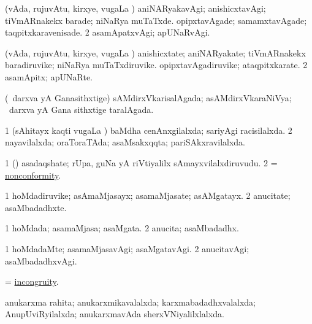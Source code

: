 \bentry
{}
\gl{\kirxvi}
\bmng
\bnum
{} (vAda, rujuvAtu, kirxye, \mo vugaLa \vi) 
\banum
{} aniNARyakavAgi; anishicxtavAgi; tiVmARnakekx barade; niNaRya muTaTxde. 
 opipxtavAgade; samamxtavAgade; taqpitxkaravenisade. 
\eanum
\numie
\num{2} asamApatxvAgi; apUNaRvAgi. 
\enum
\emng
\eentry

\bentry
{}
\gl{\nA}
\bmng
\bnum
{} (vAda, rujuvAtu, kirxye, \mo vugaLa \vi) 
\banum
{} anishicxtate; aniNARyakate; tiVmARnakekx baradiruvike; niNaRya muTaTxdiruvike. 
 opipxtavAgadiruvike; ataqpitxkarate. 
\eanum
\numie
\num{2} asamApitx; apUNaRte. 
\enum
\emng
\eentry

\bentry
{}
\gl{\gu}
\bmng
(\kanmu\ darxva yA Ganasithxtige) sAMdirxVkarisalAgada; asAMdirxVkaraNiVya; \kanmu\ darxva yA Gana sithxtige taralAgada. 
\emng
\eentry

\bentry
{}
\gl{\gu}
\bmng
\bnum
\num{1} (sAhitayx kaqti \mo vugaLa \vi) baMdha cenAnxgilalxda; sariyAgi racisilalxda. 
\num{2} nayavilalxda; oraToraTAda; asaMsakxqqta; pariSAkxravilalxda. 
\enum
\emng
\eentry

\bentry
{}
\gl{\nA}
\bmng
\bnum
\num{1} (\pArxparx) asadaqshate; rUpa, guNa yA riVtiyalilx sAmayxvilalxdiruvudu. 
\num{2} = \hyperref{kandict_n.pdf}{N}{nonconformity}{nonconformity}. 
\enum
\emng
\eentry

\bentry
{}
\gl{\nA}
\bmng
\bnum
\num{1} hoMdadiruvike; asAmaMjasayx; asamaMjasate; asAMgatayx. 
\num{2} anucitate; asaMbadadhxte. 
\enum
\emng
\eentry

\bentry
{}
\gl{\gu}
\bmng
\bnum
\num{1} hoMdada; asamaMjasa; asaMgata. 
\num{2} anucita; asaMbadadhx. 
\enum
\emng
\eentry

\bentry
{}
\gl{\kirxvi}
\bmng
\bnum
\num{1} hoMdadaMte; asamaMjasavAgi; asaMgatavAgi. 
\num{2} anucitavAgi; asaMbadadhxvAgi. 
\enum
\emng
\eentry

\bentry
{}
\gl{\nA}
\bmng
 = \hyperlink{incongruity}{incongruity}. 
\emng
\eentry

\bentry
{}
\gl{\gu}
\bmng
anukarxma rahita; anukarxmikavalalxda; karxmabadadhxvalalxda; AnupUviRyilalxda; anukarxmavAda sherxVNiyalilxlalxda. 
\emng
\eentry

